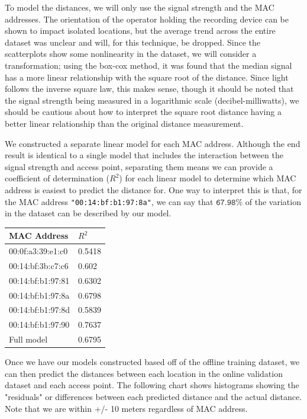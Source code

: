 \documentclass[12pt, conference]{IEEEtran}
\begin{document}
To model the distances, we will only use the signal strength and the MAC addresses. The orientation of the operator holding the recording device can be shown to impact isolated locations, but the average trend across the entire dataset was unclear and will, for this technique, be dropped. Since the scatterplots show some nonlinearity in the dataset, we will consider a transformation; using the box-cox method, it was found that the median signal has a more linear relationship with the square root of the distance. Since light follows the inverse square law, this makes sense, though it should be noted that the signal strength being measured in a logarithmic scale (decibel-milliwatts), we should be cautious about how to interpret the square root distance having a better linear relationship than the original distance measurement.

We constructed a separate linear model for each MAC address. Although the end result is identical to a single model that includes the interaction between the signal strength and access point, separating them means we can provide a coefficient of determination ($R^2$) for each linear model to determine which MAC address is easiest to predict the distance for. One way to interpret this is that, for the MAC address \texttt{"00:14:bf:b1:97:8a"}, we can say that $\texttt{67.98\%}$ of the variation in the dataset can be described by our model.


\begin{table}[]
  \begin{tabular}{|l|l|}
  \hline
  MAC Address       & $R^2$                \\ \hline
  00:0f:a3:39:e1:c0 & 0.5418               \\ \hline
  00:14:bf:3b:c7:c6 & 0.602                \\ \hline
  00:14:bf:b1:97:81 & 0.6302               \\ \hline
  00:14:bf:b1:97:8a & 0.6798               \\ \hline
  00:14:bf:b1:97:8d & 0.5839               \\ \hline
  00:14:bf:b1:97:90 & 0.7637               \\ \hline
  Full model        & 0.6795               \\ \hline
  \end{tabular} \label{fig: lm_r2}
\end{table}


Once we have our models constructed based off of the offline training dataset, we can then predict the distances between each location in the online validation dataset and each access point. The following chart shows histograms showing the "residuals" or differences between each predicted distance and the actual distance. Note that we are within +/- 10 meters regardless of MAC address.
\end{document}
